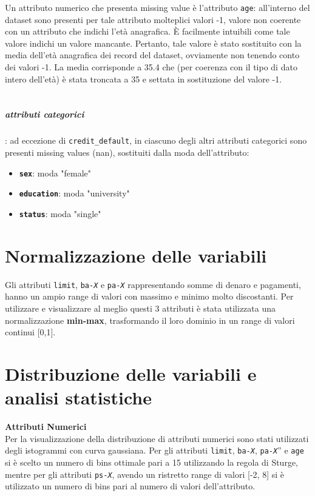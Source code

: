 Un attributo numerico che presenta missing value \`e l'attributo \texttt{age}: all'interno del dataset sono presenti per tale attributo molteplici valori -1, valore non coerente con un attributo che indichi l'et\`a anagrafica. \`E facilmente intuibili come tale valore indichi un valore mancante. Pertanto, tale valore \`e stato sostituito con la media dell'et\`a anagrafica dei record del dataset, ovviamente non tenendo conto dei valori -1. La media corrisponde a 35.4 che (per coerenza con il tipo di dato intero dell'et\`a) \`e stata troncata a 35 e settata in sostituzione del valore -1.\\\\
\subparagraph{attributi categorici}: ad eccezione di \texttt{credit\_default}, in ciascuno degli altri attributi categorici sono presenti missing values (nan), sostituiti dalla moda dell'attributo:
\begin{itemize}
\item \textbf{\texttt{sex}}: moda "female"
\item \textbf{\texttt{education}}: moda "university"
\item \textbf{\texttt{status}}: moda "single"
\end{itemize}

\section{Normalizzazione delle variabili}
Gli attributi \texttt{limit}, \texttt{ba-\textit{X}} e \texttt{pa-\textit{X}} rappresentando somme di denaro e pagamenti, hanno un ampio range di valori con massimo e minimo molto discostanti. Per utilizzare e visualizzare al meglio questi 3 attributi \`e stata utilizzata una normalizzazione \textbf{min-max}, trasformando il loro dominio in un range di valori continui [0,1].

\section{Distribuzione delle variabili e analisi statistiche}
\textbf{Attributi Numerici}\\
Per la visualizzazione della distribuzione di attributi numerici sono stati utilizzati degli istogrammi con curva gaussiana. Per gli attributi \texttt{limit},  \texttt{ba-\textit{X}}, \texttt{pa-\textit{X}}” e \texttt{age} si \`e scelto un numero di bins ottimale pari a 15 utilizzando la regola di Sturge, mentre per gli attributi  \texttt{ps-\textit{X}}, avendo un ristretto range di valori [-2, 8] si \`e utilizzato un numero di bins pari al numero di valori dell'attributo.

